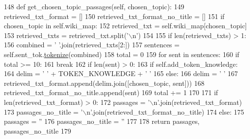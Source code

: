 \begin{DoxyCode}
148     \textcolor{keyword}{def }get\_chosen\_topic\_passages(self, chosen\_topic):
149         retrieved\_txt\_format = []
150         retrieved\_txt\_format\_no\_title = []
151         \textcolor{keywordflow}{if} chosen\_topic \textcolor{keywordflow}{in} self.wiki\_map:
152             retrieved\_txt = self.wiki\_map[chosen\_topic]
153             retrieved\_txts = retrieved\_txt.split(\textcolor{stringliteral}{'\(\backslash\)n'})
154 
155             \textcolor{keywordflow}{if} len(retrieved\_txts) > 1:
156                 combined = \textcolor{stringliteral}{' '}.join(retrieved\_txts[2:])
157                 sentences = self.sent\_tok.\hyperlink{namespaceparlai_1_1agents_1_1tfidf__retriever_1_1build__tfidf_a1fdb457e98eb4e4c26047e229686a616}{tokenize}(combined)
158                 total = 0
159                 \textcolor{keywordflow}{for} sent \textcolor{keywordflow}{in} sentences:
160                     \textcolor{keywordflow}{if} total >= 10:
161                         \textcolor{keywordflow}{break}
162                     \textcolor{keywordflow}{if} len(sent) > 0:
163                         \textcolor{keywordflow}{if} self.add\_token\_knowledge:
164                             delim = \textcolor{stringliteral}{' '} + TOKEN\_KNOWLEDGE + \textcolor{stringliteral}{' '}
165                         \textcolor{keywordflow}{else}:
166                             delim = \textcolor{stringliteral}{' '}
167                         retrieved\_txt\_format.append(delim.join([chosen\_topic, sent]))
168                         retrieved\_txt\_format\_no\_title.append(sent)
169                         total += 1
170 
171         \textcolor{keywordflow}{if} len(retrieved\_txt\_format) > 0:
172             passages = \textcolor{stringliteral}{'\(\backslash\)n'}.join(retrieved\_txt\_format)
173             passages\_no\_title = \textcolor{stringliteral}{'\(\backslash\)n'}.join(retrieved\_txt\_format\_no\_title)
174         \textcolor{keywordflow}{else}:
175             passages = \textcolor{stringliteral}{''}
176             passages\_no\_title = \textcolor{stringliteral}{''}
177 
178         \textcolor{keywordflow}{return} passages, passages\_no\_title
179 
\end{DoxyCode}
\mbox{\label{classprojects_1_1wizard__of__wikipedia_1_1knowledge__retriever_1_1knowledge__retriever_1_1KnowledgeRetrieverAgent_a6eded0e2af98d064dcf803b7d239101f}} 
